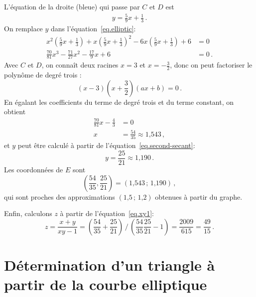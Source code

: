 L'équation de la droite (bleue) qui passe par $C$ et $D$ est 
\begin{align}
y = \frac{5}{9}x + \frac{1}{3}\,.\label{eq.second-secant}
\end{align}
On remplace $y$ dans l'équation~\ref{eq.elliptic}:
\begin{align*}
x^2\left(\frac{5}{9}x + \frac{1}{3}\right) + x\left(\frac{5}{9}x + \frac{1}{3}\right)^2 -6x\left(\frac{5}{9}x + \frac{1}{3}\right) +6 &=0\\
\frac{70}{81}x^3 - \frac{71}{27}x^2 - \frac{17}{9}x +6 &=0\,.
\end{align*}
Avec $C$ et $D$, on connaît deux racines $x=3$ et $x=-\frac{3}{2}$, donc on peut factoriser le polynôme de degré trois :
\[
(x-3)\left(x+\frac{3}{2}\right)(ax+b)=0\,.
\]
En égalant les coefficients du terme de degré trois et du terme constant, on obtient 
\begin{align*}
\frac{70}{81}x - \frac{4}{3}&=0\\
x&= \frac{54}{35}\approx \mbox{1,543}\,,
\end{align*}
et $y$ peut être calculé à partir de l'équation~\ref{eq.second-secant}:
\[
y=\frac{25}{21}\approx \mbox{1,190}\,.
\]
Les coordonnées de $E$ sont 
\[
\left(\frac{54}{35}, \frac{25}{21}\right)=(\mbox{1,543}\,;\,\mbox{1,190})\,,
\]
qui sont proches des approximations $(\mbox{1,5}\,;\,\mbox{1,2})$ obtenues à partir du graphe.

Enfin, calculons $z$ à partir de l'équation~\ref{eq.xy1}:
\[
z=\frac{x+y}{xy-1}=%
\displaystyle\left(\frac{54}{35} + \frac{25}{21}\right)%
 \, \bigg/ \,%
\displaystyle\left(\frac{54}{35}\frac{25}{21}-1\right)=%
\frac{2009}{615} = \frac{49}{15}\,.
\]

\section{Détermination d'un triangle à partir de la courbe elliptique}

\enlargethispage*{\baselineskip}

